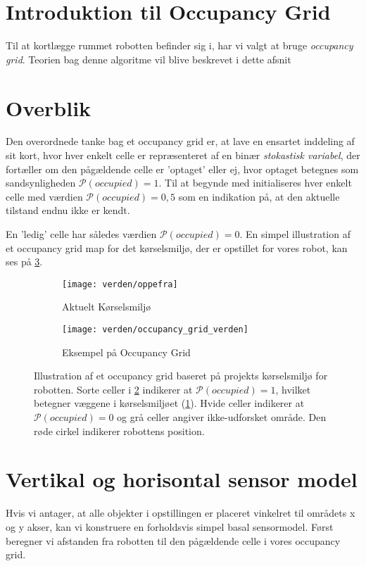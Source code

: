 \section{Introduktion til Occupancy Grid}
Til at kortlægge rummet robotten befinder sig i, har vi valgt at bruge \textit{occupancy grid}.
Teorien bag denne algoritme vil blive beskrevet i dette afsnit

\section{Overblik}
Den overordnede tanke bag et occupancy grid er, at lave en ensartet inddeling af sit kort, hvor hver enkelt celle er repræsenteret af en binær \textit{stokastisk variabel}, der fortæller om den pågældende celle er 'optaget' eller ej, hvor optaget betegnes som sandsynligheden $\mathcal{P}(occupied) = 1$.
Til at begynde med initialiseres hver enkelt celle med værdien $\mathcal{P}(occupied) = 0,5$ som en indikation på, at den aktuelle tilstand endnu ikke er kendt.

En 'ledig' celle har således værdien $\mathcal{P}(occupied) = 0$.
En simpel illustration af et occupancy grid map for det kørselsmiljø, der er opstillet for vores robot, kan ses på \cref{map:approx_occupancy_grid}.

\begin{figure}[h] %
\centering
	\begin{subfigure}[b]{.45\textwidth}
	\centering
	\texttt{[image: verden/oppefra]}
	\caption{Aktuelt Kørselsmiljø}
	\label{map:world}
	\end{subfigure}
	\begin{subfigure}[b]{.45\textwidth}
	\centering
	\texttt{[image: verden/occupancy\_grid\_verden]}
	\caption{Eksempel på Occupancy Grid}
	\label{map:occupancy_grid}
	\end{subfigure}
\caption{Illustration af et occupancy grid baseret på projekts kørselsmiljø for robotten. Sorte celler i \cref{map:occupancy_grid} indikerer at $\mathcal{P}(occupied) = 1$, hvilket betegner væggene i kørselsmiljøet (\cref{map:world}). Hvide celler indikerer at $\mathcal{P}(occupied) = 0$ og grå celler angiver ikke-udforsket område. Den røde cirkel indikerer robottens position.}
\label{map:approx_occupancy_grid}
\end{figure}

\section{Vertikal og horisontal sensor model}\label{mapping:sensormodel}
Hvis vi antager, at alle objekter i opstillingen er placeret vinkelret til områdets x og y akser,
kan vi konstruere en forholdsvis simpel basal sensormodel.
Først beregner vi afstanden fra robotten til den pågældende celle i vores occupancy grid.

